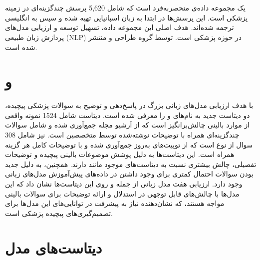 \documentclass[11pt, a4paper, oneside]{book}
\begin{document}
		\section{}
			یک مجموعه داده‌ی منحصربه‌فرد است که شامل 5,620 پرسش چندگزینه‌ای در زمینه پزشکی است. این پرسش‌ها در ابتدا به زبان اسپانیایی تهیه شده و سپس به انگلیسی ترجمه شده‌اند. هدف اصلی این مجموعه داده، تسهیل توسعه و ارزیابی مدل‌های پردازش زبان طبیعی (NLP) در حوزه پزشکی است.  توسط گروه  طراحی و منتشر شده است. \cite{gururajan_aloe_2024}

		\section{ و }
			با هدف ارزیابی مدل‌های زبانی بزرگ در پاسخ‌دهی و توضیح به سوالات پزشکی پیچیده، دو دیتاست جدید به نام‌های  و  را معرفی شده است. دیتاست  شامل 1524 نمونه واقعی از موارد بالینی چالش‌برانگیز است که از آرشیو  مجله  جمع‌آوری شده و شامل سوالات چندگزینه‌ای همراه با توضیحات نوشته‌شده توسط متخصصین است.  نیز شامل 308 سوال از نوع  است که از توییت‌های  به‌روز جمع‌آوری شده و با توضیحات کامل هر گزینه همراه است. این دیتاست‌ها به دلیل پوشش موضوعات بالینی پیچیده و توضیحات تفصیلی، چالش بیشتری نسبت به دیتاست‌های موجود مانند  دارند. همچنین، به دلیل جدید بودن سوالات احتمال کمتری برای وجود داشتن در داده‌های پیش‌آموزش مدل‌های زبانی وجود دارد. ارزیابی هفت مدل زبانی از جمله  و  روی این دیتاست‌ها نشان داد که این مدل‌ها با چالش‌های قابل توجهی در استدلال و ارائه توضیحات برای سوالات بالینی مواجه هستند، که نشان‌دهنده نیاز به پیشرفت در توانایی‌های این مدل‌ها برای تصمیم‌گیری‌های پیچیده پزشکی است. \cite{chen_benchmarking_2024}
		
		\section{دیتاست‌های مدل }
			
\end{document}

